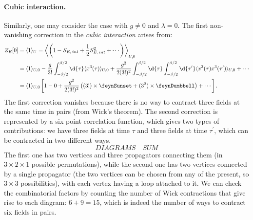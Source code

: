 \paragraph{Cubic interaction.} Similarly, one may consider the case with \(g \neq 0\) and \(\lambda = 0\). The first non-vanishing correction in the \textit{cubic interaction} arises from:
\[
    \begin{aligned}
        Z_E[0] & = \langle 1 \rangle_U = \left\langle \left( 1- S_{E,\,int} + \frac{1}{2}S_{E,\,int}^2 + \cdots \right) \right\rangle_{U,0}                                                                                                                                                  \\
               & = \langle 1 \rangle_{U,0} - \frac{g}{3!} \int_{-\beta/2}^{\beta/2} \d{\tau} \langle x^3(\tau)\rangle_{U,0} + \frac{g^2}{2(3!)^2} \int_{-\beta/2}^{\beta/2} \d{\tau} \int_{-\beta/2}^{\beta/2} \d{\tau^{\prime}} \langle x^3(\tau) x^3(\tau^{\prime}) \rangle_{U,0} + \cdots \\
               & = \langle 1 \rangle_{U,0} \left[ 1 - 0 + \frac{g^2}{2(3!)^2}\left((3!)\times \feynSunset + (3^2)\times \feynDumbbell \right) + \cdots \right].
    \end{aligned}
\]
The first correction vanishes because there is no way to contract three fields at the same time in pairs (from Wick's theorem). The second correction is represented by a six-point correlation function, which gives two types of contributions: we have three fields at time \(\tau\) and three fields at time \(\tau^{\prime}\), which can be contracted in two different ways.
\[
    DIAGRAMS \quad SUM
\]
The first one has two vertices and three propagators connecting them (in \(3\times 2\times 1\) possible permutations), while the second one has two vertices connected by a single propagator (the two vertices can be chosen from any of the present, so \(3\times 3\) possibilities), with each vertex having a loop attached to it. We can check the combinatorial factors by counting the number of Wick contractions that give rise to each diagram: \(6+9 = 15\), which is indeed the number of ways to contract six fields in pairs.


